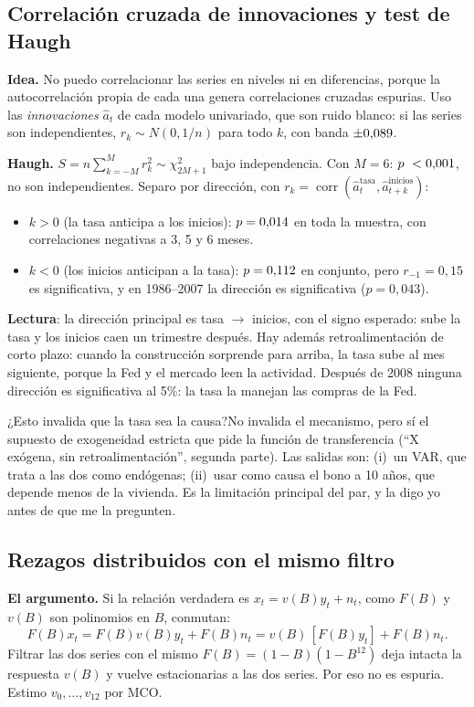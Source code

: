 \documentclass[11pt,a4paper]{article}
\newcommand{\Q}[2]{\begin{pregunta}{#1}#2\end{pregunta}}
\begin{document}
\subsection{Correlaci\'on cruzada de innovaciones y test de Haugh}
\textbf{Idea.} No puedo correlacionar las series en niveles ni en diferencias, porque la autocorrelaci\'on propia de cada una genera correlaciones cruzadas espurias. Uso las \emph{innovaciones} $\hat a_t$ de cada modelo univariado, que son ruido blanco: si las series son independientes, $r_k\sim N(0,1/n)$ para todo $k$, con banda $\pm0{,}089$.

\textbf{Haugh.} $S=n\sum_{k=-M}^{M}r_k^2\sim\chi^2_{2M+1}$ bajo independencia. Con $M=6$: $p\ <0{,}001$, no son independientes. Separo por direcci\'on, con $r_k=\operatorname{corr}(\hat a^{\text{tasa}}_t,\hat a^{\text{inicios}}_{t+k})$:
\begin{itemize}
\item $k>0$ (la tasa anticipa a los inicios): $p=0{,}014$ en toda la muestra, con correlaciones negativas a 3, 5 y 6 meses.
\item $k<0$ (los inicios anticipan a la tasa): $p=0{,}112$ en conjunto, pero $r_{-1}=0{,}15$ es significativa, y en 1986--2007 la direcci\'on es significativa ($p=0{,}043$).
\end{itemize}
\textbf{Lectura}: la direcci\'on principal es tasa $\to$ inicios, con el signo esperado: sube la tasa y los inicios caen un trimestre despu\'es. Hay adem\'as retroalimentaci\'on de corto plazo: cuando la construcci\'on sorprende para arriba, la tasa sube al mes siguiente, porque la Fed y el mercado leen la actividad. Despu\'es de 2008 ninguna direcci\'on es significativa al 5\%: la tasa la manejan las compras de la Fed.

\Q{¿Esto invalida que la tasa sea la causa?}{No invalida el mecanismo, pero s\'i el supuesto de exogeneidad estricta que pide la funci\'on de transferencia (``X ex\'ogena, sin retroalimentaci\'on'', segunda parte). Las salidas son: (i)~un VAR, que trata a las dos como end\'ogenas; (ii)~usar como causa el bono a 10 a\~nos, que depende menos de la vivienda. Es la limitaci\'on principal del par, y la digo yo antes de que me la pregunten.}

\subsection{Rezagos distribuidos con el mismo filtro}
\textbf{El argumento.} Si la relaci\'on verdadera es $x_t=v(B)y_t+n_t$, como $F(B)$ y $v(B)$ son polinomios en $B$, conmutan:
\[
F(B)x_t=F(B)v(B)y_t+F(B)n_t=v(B)\,[F(B)y_t]+F(B)n_t .
\]
Filtrar las dos series con el mismo $F(B)=(1-B)(1-B^{12})$ deja intacta la respuesta $v(B)$ y vuelve estacionarias a las dos series. Por eso no es espuria. Estimo $v_0,\dots,v_{12}$ por MCO.
\end{document}
